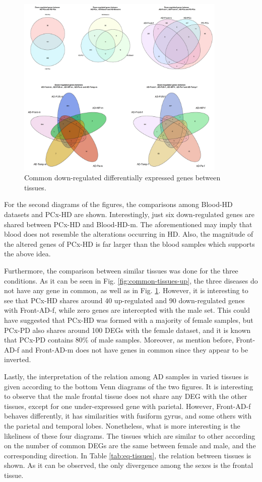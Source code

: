 \begin{figure}[!ht]
    \centerline{\includegraphics[width=10cm]{Figures/common-tissue-col.jpg}}
\caption{Common down-regulated differentially expressed genes between tissues.}
\label{fig:common-tissues-down}
\end{figure}

For the second diagrams of the figures, the comparisons among Blood-HD datasets and PCx-HD are shown. Interestingly, just six down-regulated genes are shared between PCx-HD and Blood-HD-m. The aforementioned may imply that blood does not resemble the alterations occurring in HD. Also, the magnitude of the altered genes of PCx-HD is far larger than the blood samples which supports the above idea. 

Furthermore, the comparison between similar tissues was done for the three conditions. As it can be seen in Fig. \ref{fig:common-tissues-up}, the three diseases do not have any gene in common, as well as in Fig. \ref{fig:common-tissues-down}. However, it is interesting to see that PCx-HD shares around 40 up-regulated and 90 down-regulated genes with Front-AD-f, while zero genes are intercepted with the male set. This could have suggested that PCx-HD was formed with a majority of female samples, but PCx-PD also shares around 100 DEGs with the female dataset, and it is known that PCx-PD contains 80\% of male samples. Moreover, as mention before, Front-AD-f and Front-AD-m does not have genes in common since they appear to be inverted.

Lastly, the interpretation of the relation among AD samples in varied tissues is given according to the bottom Venn diagrams of the two figures. It is interesting to observe that the male frontal tissue does not share any DEG with the other tissues, except for one under-expressed gene with parietal. However, Front-AD-f behaves differently, it has similarities with fusiform gyrus, and some others with the parietal and temporal lobes. Nonetheless, what is more interesting is the likeliness of these four diagrams. The tissues which are similar to other according on the number of common DEGs are the same between female and male, and the corresponding direction. In Table \ref{tab:eq-tissues}, the relation between tissues is shown. As it can be observed, the only divergence among the sexes is the frontal tissue.

